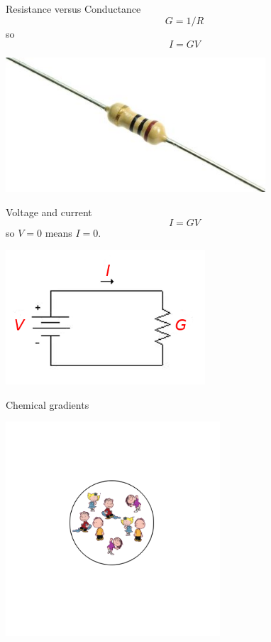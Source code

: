 \documentclass{beamer}
\newcommand{\crish}{\color{reddish}}
\newcommand{\cbla}{\color{black}}
\begin{document}
\begin{frame}{Resistance versus Conductance}
\crish
$$G=1/R$$
\cbla{}so\crish
$$I=GV$$
\cbla
\begin{center}
    \includegraphics[height=5cm]{resistor.jpg}
\end{center}
\end{frame}


\begin{frame}{Voltage and current}
\crish
$$I=GV$$
\cbla{}so\crish{} $V=0$\cbla{} means \crish{} $I=0$\cbla{}.
\begin{center}
    \includegraphics[height=5cm]{basic_circuit_g.png}
\end{center}
\end{frame}





\begin{frame}{Chemical gradients}
\begin{center}
    \includegraphics[height=8cm]{children1.png}
\end{center}
\end{frame}
\end{document}
